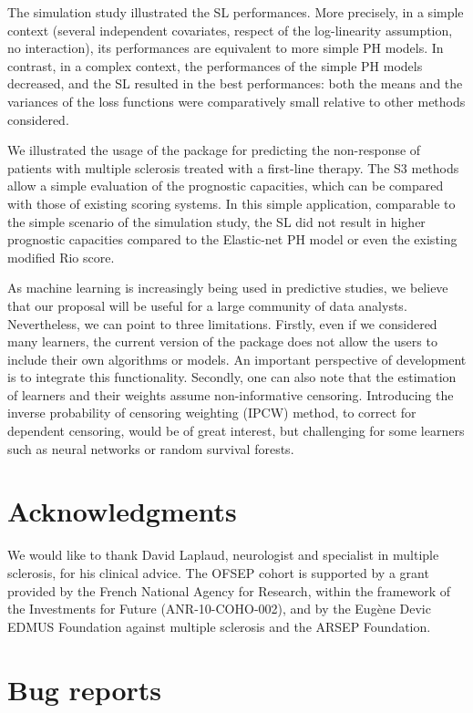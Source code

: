 The simulation study illustrated the SL performances. More precisely, in a simple context (several independent covariates, respect of the log-linearity assumption, no interaction), its performances are equivalent to more simple PH models. In contrast, in a complex context, the performances of the simple PH models decreased, and the SL resulted in the best performances: both the means and the variances of the loss functions were comparatively small relative to other methods considered.

We illustrated the usage of the package for predicting the non-response of patients with multiple sclerosis treated with a first-line therapy. The S3 methods allow a simple evaluation of the prognostic capacities, which can be compared with those of existing scoring systems. In this simple application, comparable to the simple scenario of the simulation study, the SL did not result in higher prognostic capacities compared to the Elastic-net PH model or even the existing modified Rio score.

As machine learning is increasingly being used in predictive studies, we believe that our proposal will be useful for a large community of data analysts. Nevertheless, we can point to three limitations. Firstly, even if we considered many learners, the current version of the package does not allow the users to include their own algorithms or models. An important perspective of development is to integrate this functionality. Secondly, one can also note that the estimation of learners and their weights assume non-informative censoring. Introducing the inverse probability of censoring weighting (IPCW) method, to correct for dependent censoring, would be of great interest, but challenging for some learners such as neural networks or random survival forests.

\hypertarget{acknowledgments}{%
\section{Acknowledgments}\label{acknowledgments}}

We would like to thank David Laplaud, neurologist and specialist in multiple sclerosis, for his clinical advice. The OFSEP cohort is supported by a grant provided by the French National Agency for Research, within the framework of the Investments for Future (ANR-10-COHO-002), and by the Eugène Devic EDMUS Foundation against multiple sclerosis and the ARSEP Foundation.

\hypertarget{bug-reports}{%
\section{Bug reports}\label{bug-reports}}

